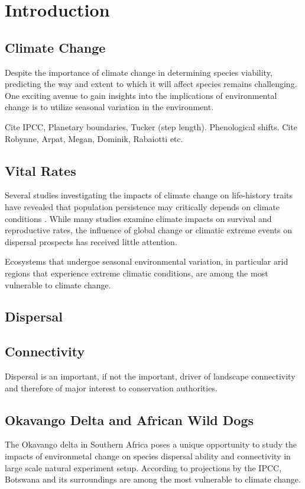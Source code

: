 \documentclass[abstract=on,10pt,a4paper,bibliography=totocnumbered]{article}
\begin{document}
\section{Introduction}
\subsection{Climate Change}

Despite the importance of climate change in determining species viability,
predicting the way and extent to which it will affect species remains
challenging. One exciting avenue to gain insights into the implications of
environmental change is to utilize seasonal variation in the environment.

Cite IPCC, Planetary boundaries, Tucker (step length). Phenological shifts. Cite
Robynne, Arpat, Megan, Dominik, Rabaiotti etc.

\subsection{Vital Rates}
Several studies investigating the impacts of climate change on life-history
traits have revealed that population persistence may critically depends on
climate conditions \citep{Paniw.2019}. While many studies examine climate
impacts on survival and reproductive rates, the influence of global change or
climatic extreme events on dispersal prospects has received little attention.

Ecosystems that undergoe seasonal environmental variation, in particular arid
regions that experience extreme climatic conditions, are among the most
vulnerable to climate change.

\subsection{Dispersal}
\subsection{Connectivity}
Dispersal is an important, if not the important, driver of landscape
connectivity and therefore of major interest to conservation authorities.

\subsection{Okavango Delta and African Wild Dogs}
The Okavango delta in Southern Africa poses a unique opportunity to study the
impacts of environmetal change on species dispersal ability and connectivity in
large scale natural experiment setup. According to projections by the IPCC,
Botswana and its surroundings are among the most vulnerable to climate change.
\end{document}
